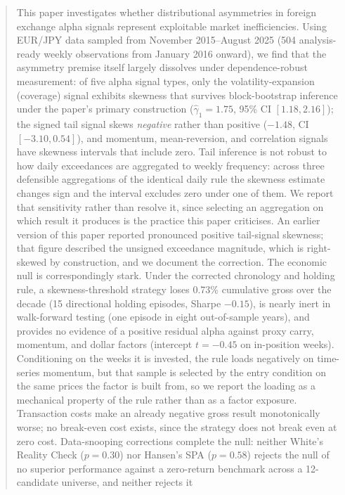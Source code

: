 \documentclass[11pt]{article}
\begin{document}
\begin{abstract}
\noindent This paper investigates whether distributional asymmetries in foreign
exchange alpha signals represent exploitable market inefficiencies. Using EUR/JPY
data sampled from November 2015--August 2025 (504 analysis-ready weekly observations from January 2016 onward), we find
that the asymmetry premise itself largely dissolves under dependence-robust
measurement: of five alpha signal types, only the volatility-expansion (coverage)
signal exhibits skewness that survives block-bootstrap inference under the
paper's primary construction ($\hat{\gamma}_1 = 1.75$, 95\% CI $[1.18, 2.16]$);
the signed tail signal skews \emph{negative} rather than positive ($-1.48$,
CI $[-3.10, 0.54]$), and momentum, mean-reversion, and correlation signals have
skewness intervals that include zero. Tail inference is not robust to how daily
exceedances are aggregated to weekly frequency: across three defensible
aggregations of the identical daily rule the skewness estimate changes sign and
the interval excludes zero under one of them. We report that sensitivity rather
than resolve it, since selecting an aggregation on which result it produces is
the practice this paper criticises.
An earlier version of this paper reported pronounced positive tail-signal
skewness; that figure described the unsigned exceedance magnitude, which is
right-skewed by construction, and we document the correction. The economic null
is correspondingly stark. Under the corrected chronology and holding rule, a
skewness-threshold strategy loses 0.73\% cumulative gross over the decade (15
directional holding episodes, Sharpe $-0.15$), is nearly inert in walk-forward
testing (one episode in eight out-of-sample years), and provides no evidence of
a positive residual alpha against proxy carry, momentum, and dollar factors
(intercept $t = -0.45$ on in-position weeks). Conditioning on the weeks it is
invested, the rule loads negatively on time-series momentum, but that sample is
selected by the entry condition on the same prices the factor is built from, so
we report the loading as a mechanical property of the rule rather than as a
factor exposure. Transaction costs make an already negative gross
result monotonically worse; no break-even cost exists, since the strategy does
not break even at zero cost.
Data-snooping corrections complete the null: neither White's Reality Check ($p = 0.30$) nor Hansen's SPA ($p = 0.58$) rejects the null of no superior performance against
a zero-return benchmark across a 12-candidate universe, and neither rejects it

\end{abstract}
\end{document}
